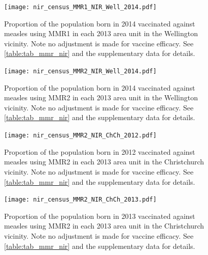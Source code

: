\documentclass{article}
\begin{document}
\begin{figure}
\begin{center}
    \texttt{[image: nir\_census\_MMR1\_NIR\_Well\_2014.pdf]}
 \end{center}
    \caption{Proportion of the population born in 2014 vaccinated against measles using MMR1 in each 2013 area unit in the Wellington vicinity. Note no adjustment is made for vaccine efficacy. See \autoref{table:tab_mmr_nir} and the supplementary data for details.}
\label{fig:fig12014_w}
\end{figure}


\begin{figure}
\begin{center}
    \texttt{[image: nir\_census\_MMR2\_NIR\_Well\_2014.pdf]}
 \end{center}
    \caption{Proportion of the population born in 2014 vaccinated against measles using MMR2 in each 2013 area unit in the Wellington vicinity. Note no adjustment is made for vaccine efficacy. See \autoref{table:tab_mmr_nir} and the supplementary data for details.}
\label{fig:fig22014_w}
\end{figure}


\begin{figure}
\begin{center}
    \texttt{[image: nir\_census\_MMR2\_NIR\_ChCh\_2012.pdf]}
 \end{center}
    \caption{Proportion of the population born in 2012 vaccinated against measles using MMR2 in each 2013 area unit in the Christchurch vicinity. Note no adjustment is made for vaccine efficacy. See \autoref{table:tab_mmr_nir} and the supplementary data for details.}
\label{fig:fig22012_c}
\end{figure}

\begin{figure}
\begin{center}
    \texttt{[image: nir\_census\_MMR2\_NIR\_ChCh\_2013.pdf]}
 \end{center}
    \caption{Proportion of the population born in 2013 vaccinated against measles using MMR2 in each 2013 area unit in the Christchurch vicinity. Note no adjustment is made for vaccine efficacy. See \autoref{table:tab_mmr_nir} and the supplementary data for details.}
\label{fig:fig22013_c}
\end{figure}
\end{document}

